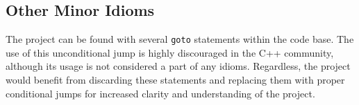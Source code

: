 \subsection{Other Minor Idioms}
The project can be found with several \texttt{goto} statements within the code base. The use of this unconditional jump is highly discouraged in the C++ community, although its usage is not considered a part of any idioms. Regardless, the project would benefit from discarding these statements and replacing them with proper conditional jumps for increased clarity and understanding of the project.
